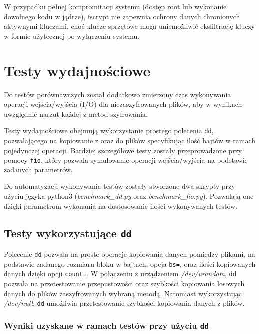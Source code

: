 \documentclass[a4paper]{article}
\begin{document}
W przypadku pełnej kompromitacji systemu (dostęp root lub wykonanie dowolnego kodu w jądrze),
fscrypt nie zapewnia ochrony danych chronionych aktywnymi kluczami, choć klucze sprzętowe mogą
uniemożliwić eksfiltrację kluczy w formie użytecznej po wyłączeniu systemu.


\section{Testy wydajnościowe}
Do testów porównawczych został dodatkowo zmierzony czas wykonywania operacji wejścia/wyjścia
(I/O) dla niezaszyfrowanych plików, aby w wynikach uwzględnić narzut każdej z metod szyfrowania.

Testy wydajnościowe obejmują wykorzystanie prostego polecenia \texttt{dd}, pozwalającego na
kopiowanie z oraz do plików specyfikując ilość bajtów w ramach pojedynczej operacji.
Bardziej szczegółowe testy zostały przeprowadzone przy pomocy \texttt{fio}, który pozwala
symulowanie operacji wejścia/wyjścia na podstawie zadanych parametrów.

Do automatyzacji wykonywania testów zostały stworzone dwa skrypty przy użyciu języka python3
(\textit{benchmark\_dd.py} oraz \textit{benchmark\_fio.py}). Pozwalają one dzięki
parametrom wykonania na dostosowanie ilości wykonywanych testów.

\subsection{Testy wykorzystujące \texttt{dd}}
Polecenie \texttt{dd} pozwala na proste operacje kopiowania danych pomiędzy plikami,
na podstawie zadanego rozmiaru bloku w bajtach, opcja \texttt{bs=}, oraz ilości kopiowanych
danych dzięki opcji \texttt{count=}. W połączeniu z urządzeniem \textit{/dev/urandom},
\texttt{dd} pozwala na przetestowanie przepustowości oraz szybkości kopiowania losowych danych
do plików zaszyfrowanych wybraną metodą. Natomiast wykorzystując \textit{/dev/null},
\texttt{dd} umożliwia przetestowanie szybkości kopiowania danych z plików.


\subsubsection{Wyniki uzyskane w ramach testów przy użyciu \texttt{dd}}
\end{document}
